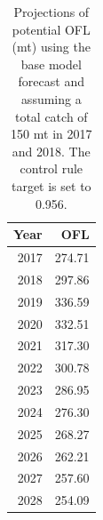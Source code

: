\documentclass[12pt,]{article}
\begin{document}
\begin{table}[ht]
\centering
\caption{Projections of potential OFL (mt) using the base model 
                                        forecast and assuming a total catch of 150 mt in 2017 and 2018. 
                                        The control rule target is set to 0.956.} 
\label{tab:OFL_projection}
\begin{tabular}{rr}
  \hline
Year & OFL \\ 
  \hline
2017 & 274.71 \\ 
  2018 & 297.86 \\ 
  2019 & 336.59 \\ 
  2020 & 332.51 \\ 
  2021 & 317.30 \\ 
  2022 & 300.78 \\ 
  2023 & 286.95 \\ 
  2024 & 276.30 \\ 
  2025 & 268.27 \\ 
  2026 & 262.21 \\ 
  2027 & 257.60 \\ 
  2028 & 254.09 \\ 
   \hline
\end{tabular}
\end{table}\begin{table}[ht]
\centering
\caption{Summary of 10-year 
                                             projections beginning in 2018 
                                             for alternate states of nature based on 
                                             an axis of uncertainty for the base model.  Columns range over low, mid, and high
                                             states of nature, and rows range over different 
                                             assumptions of catch levels. An entry of "--" 
                                             indicates that the stock is driven to very low 
                                             abundance under the particular scenario.} 
\label{tab:Decision_table_mod1}
\end{table}
\end{document}
